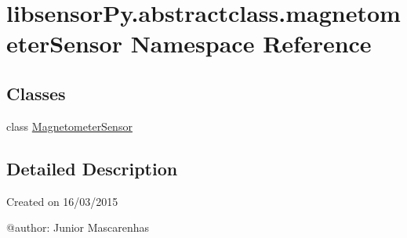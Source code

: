 \hypertarget{namespacelibsensorPy_1_1abstractclass_1_1magnetometerSensor}{}\section{libsensor\+Py.\+abstractclass.\+magnetometer\+Sensor Namespace Reference}
\label{namespacelibsensorPy_1_1abstractclass_1_1magnetometerSensor}
\subsection*{Classes}
\begin{DoxyCompactItemize}
\item 
class \hyperlink{classlibsensorPy_1_1abstractclass_1_1magnetometerSensor_1_1MagnetometerSensor}{Magnetometer\+Sensor}
\end{DoxyCompactItemize}


\subsection{Detailed Description}
\begin{DoxyVerb}Created on 16/03/2015

@author: Junior Mascarenhas
\end{DoxyVerb}
 